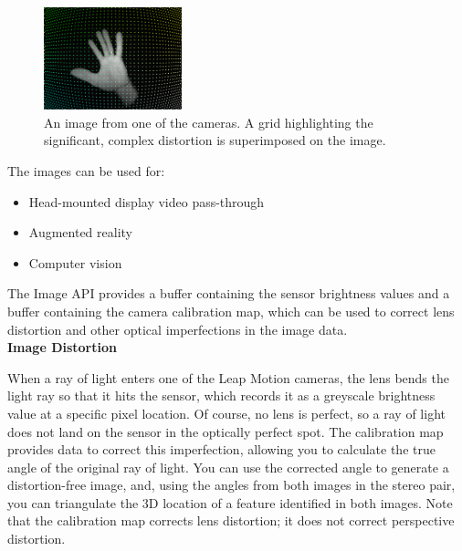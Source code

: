 \documentclass[journal]{IEEEtran}										    %
\begin{document}
                \begin{figure}[h]
                    \centering
                    \includegraphics[width=4cm]{Leap-Image-Raw}
                    \caption{An image from one of the cameras. A grid highlighting 
                    the significant, complex distortion is superimposed on the image.}
                    \label{fig:leapCam1}
                \end{figure}
                The images can be used for:
                \begin{itemize}
                    \item Head-mounted display video pass-through
                    \item Augmented reality
                    \item Computer vision 
                \end{itemize} 
                The Image API provides a buffer containing the sensor brightness
                values and a buffer containing the camera calibration map, 
                which can be used to correct lens distortion and other optical 
                imperfections in the image data.  \\

                \textbf{Image Distortion}

                When a ray of light enters one of the Leap Motion cameras, the 
                lens bends the light ray so that it hits the sensor, which records 
                it as a greyscale brightness value at a specific pixel location. 
                Of course, no lens is perfect, so a ray of light does not land 
                on the sensor in the optically perfect spot. The calibration 
                map provides data to correct this imperfection, allowing you to 
                calculate the true angle of the original ray of light. You can 
                use the corrected angle to generate a distortion-free image, and, 
                using the angles from both images in the stereo pair, you can 
                triangulate the 3D location of a feature identified in both images. 
                Note that the calibration map corrects lens distortion; it does 
                not correct perspective distortion.
\end{document}
